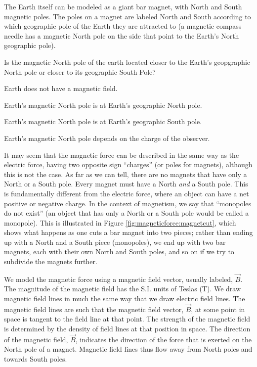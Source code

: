 The Earth itself can be modeled as a giant bar magnet, with North and South magnetic poles. The poles on a magnet are labeled North and South according to which geographic pole of the Earth they are attracted to (a magnetic compass needle has a magnetic North pole on the side that point to the Earth's North geographic pole).


\begin{checkpoint}{}
	\begin{MCquestion}{Is the magnetic North pole of the earth located closer to the Earth's geopgraphic North pole or closer to its geographic South Pole?}
		\item Earth does not have a magnetic field.
		\item Earth's magnetic North pole is at Earth's geographic North pole.
		\item Earth's magnetic North pole is at Earth's geographic South pole. \correct
		\item Earth's magnetic North pole depends on the charge of the observer.
	\end{MCquestion}
\end{checkpoint}

It may seem that the magnetic force can be described in the same way as the electric force, having two opposite sign ``charges'' (or poles for magnets), although this is not the case. As far as we can tell, there are no magnets that have only a North or a South pole. Every magnet must have a North \textit{and} a South pole. This is fundamentally different from the electric force, where an object can have a net positive or negative charge. In the context of magnetism, we say that ``monopoles do not exist'' (an object that has only a North or a South pole would be called a monopole). This is illustrated in Figure \ref{fig:magneticforce:magnetcut}, which shows what happens as one cuts a bar magnet into two pieces; rather than ending up with a North and a South piece (monopoles), we end up with two bar magnets, each with their own North and South poles, and so on if we try to subdivide the magnets further.


We model the magnetic force using a magnetic field vector, usually labeled, $\vec B$. The magnitude of the magnetic field has the S.I. units of Teslas (\si{T}). We draw magnetic field lines in much the same way that we draw electric field lines. The magnetic field lines are such that the magnetic field vector, $\vec B$, at some point in space is tangent to the field line at that point. The strength of the magnetic field is determined by the density of field lines at that position in space. The direction of the magnetic field, $\vec B$, indicates the direction of the force that is exerted on the North pole of a magnet. Magnetic field lines thus flow away from North poles and towards South poles. 

